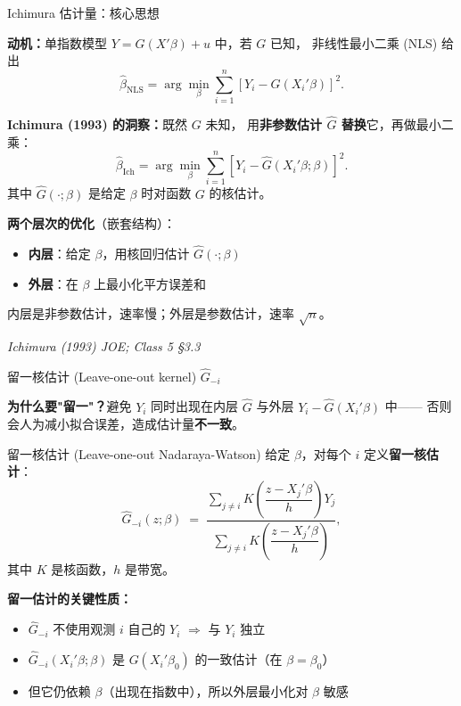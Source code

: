 \documentclass[aspectratio=169, 10pt]{beamer}
\begin{document}
\begin{frame}{Ichimura 估计量：核心思想}

  \textbf{动机：}单指数模型 $Y = G(X'\beta) + u$ 中，若 $G$ 已知，
  非线性最小二乘 (NLS) 给出
  $$\hat\beta_{\text{NLS}} = \arg\min_{\beta} \sum_{i=1}^n [Y_i - G(X_i'\beta)]^2.$$

  \begin{keybox}
    \textbf{Ichimura (1993) 的洞察：}既然 $G$ 未知，
    用\textbf{非参数估计 $\hat G$ 替换}它，再做最小二乘：
    $$\hat\beta_{\text{Ich}} = \arg\min_{\beta} \sum_{i=1}^n [Y_i - \hat G(X_i'\beta; \beta)]^2.$$
    其中 $\hat G(\cdot; \beta)$ 是给定 $\beta$ 时对函数 $G$ 的核估计。
  \end{keybox}

  \begin{highlightbox}
    \textbf{两个层次的优化}（嵌套结构）：
    \begin{itemize}\setlength{\itemsep}{1pt}
      \item \textbf{内层}：给定 $\beta$，用核回归估计 $\hat G(\cdot; \beta)$
      \item \textbf{外层}：在 $\beta$ 上最小化平方误差和
    \end{itemize}
    内层是非参数估计，速率慢；外层是参数估计，速率 $\sqrt{n}$。
  \end{highlightbox}

  \hfill{\scriptsize\textit{Ichimura (1993) JOE; Class 5 §3.3}}

\end{frame}

\begin{frame}[shrink=8]{留一核估计 (Leave-one-out kernel) $\hat G_{-i}$}

  \textbf{为什么要"留一"？}避免 $Y_i$ 同时出现在内层 $\hat G$ 与外层 $Y_i - \hat G(X_i'\beta)$ 中——
  否则会人为减小拟合误差，造成估计量\textbf{不一致}。

  \begin{definitionbox}{{留一核估计 (Leave-one-out Nadaraya-Watson)}}
    给定 $\beta$，对每个 $i$ 定义\textbf{留一核估计}：
    $$\hat G_{-i}(z; \beta) \;=\;
    \frac{\sum_{j \neq i} K\!\left(\dfrac{z - X_j'\beta}{h}\right) Y_j}
         {\sum_{j \neq i} K\!\left(\dfrac{z - X_j'\beta}{h}\right)},$$
    其中 $K$ 是核函数，$h$ 是带宽。
  \end{definitionbox}

  \begin{keybox}
    \textbf{留一估计的关键性质：}
    \begin{itemize}\setlength{\itemsep}{1pt}
      \item $\hat G_{-i}$ 不使用观测 $i$ 自己的 $Y_i$ $\Rightarrow$ 与 $Y_i$ 独立
      \item $\hat G_{-i}(X_i'\beta; \beta)$ 是 $G(X_i'\beta_0)$ 的一致估计（在 $\beta = \beta_0$）
      \item 但它仍依赖 $\beta$（出现在指数中），所以外层最小化对 $\beta$ 敏感
    \end{itemize}
  \end{keybox}

\end{frame}
\end{document}
